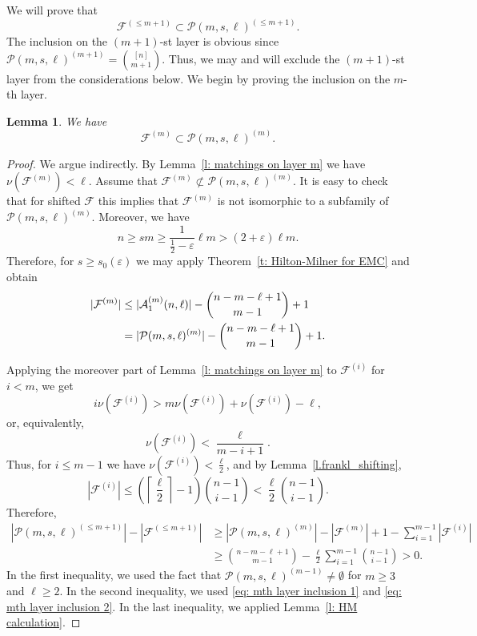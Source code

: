 \documentclass{article}
\newtheorem{lemma}[theorem]{Lemma}
\begin{document}
We will prove that
\[
\mathcal{F}^{(\leq m + 1)} \subset \mathcal{P}(m, s, \ell)^{(\leq m+1)}.
\]
The inclusion on the $(m+1)$-st layer is obvious since
$
\mathcal{P}(m, s, \ell)^{(m+1)} = {[n] \choose m + 1}.
$
Thus, we may and will exclude the $(m+1)$-st layer from the considerations below.
We begin by proving the inclusion on the $m$-th layer.

\begin{lemma} \label{l: mth layer inclusion} We have
    \[
    \mathcal{F}^{(m)} \subset \mathcal{P}(m, s, \ell)^{(m)}.
    \]
\end{lemma}

\begin{proof}
    We argue indirectly. By Lemma~\ref{l: matchings on layer m} we have $\nu(\mathcal{F}^{(m)}) < \ell$. Assume that
    $\mathcal{F}^{(m)} \not\subset \mathcal{P}(m, s, \ell)^{(m)}.$
    It is easy to check that for shifted $\mathcal{F}$ this implies that $\mathcal{F}^{(m)}$ is not isomorphic to a subfamily of $\mathcal{P}(m, s, \ell)^{(m)}$. Moreover, we have
    \[
    n \geq sm \geq \frac{1}{\frac{1}{2}-\varepsilon}\ell m > (2+\varepsilon)\ell m.
    \]
    Therefore, for $s \geq s_0(\varepsilon)$ we may apply Theorem~\ref{t: Hilton-Milner for EMC} and obtain
    \begin{align}
        |\mathcal{F}^{(m)}| \notag
        &\leq |\mathcal{A}_1^{(m)}(n,\ell)| - {n - m - \ell + 1 \choose m - 1} + 1 \\
        \label{eq: mth layer inclusion 1}
        &= |\mathcal{P}(m, s, \ell)^{(m)}| - {n - m - \ell + 1 \choose m - 1} + 1.
    \end{align}

    Applying the moreover part of Lemma~\ref{l: matchings on layer m} to $\mathcal{F}^{(i)}$ for $i < m$, we get
    \[
    i\nu(\mathcal{F}^{(i)}) > m\nu(\mathcal{F}^{(i)}) + \nu(\mathcal{F}^{(i)}) - \ell,
    \]
    or, equivalently,
    \[
    \nu(\mathcal{F}^{(i)}) < \frac{\ell}{m-i+1}.
    \]
    Thus, for $i \leq m-1$ we have $\nu(\mathcal{F}^{(i)}) < \frac{\ell}{2}$, and by Lemma~\ref{l.frankl_shifting},
    \begin{equation} \label{eq: mth layer inclusion 2}
        |\mathcal{F}^{(i)}| \leq \left(\left\lceil \frac{\ell}{2}\right\rceil - 1\right){n - 1 \choose i - 1} < \frac{\ell}{2}{n - 1 \choose i - 1}.
    \end{equation}
    Therefore,
    \begin{align*}
        |\mathcal{P}(m, s, \ell)^{(\leq m+1)}| - |\mathcal{F}^{(\leq m+1)}|
        &\ge |\mathcal{P}(m, s, \ell)^{(m)}| - |\mathcal{F}^{(m)}| +1 - \sum_{i=1}^{m-1}|\mathcal{F}^{(i)}| \\
        &\geq {n - m - \ell + 1 \choose m - 1}  - \frac{\ell}{2}\sum_{i=1}^{m-1} {n - 1 \choose i - 1} > 0.
    \end{align*}
    In the first inequality, we used the fact that $\mathcal{P}(m, s, \ell)^{(m-1)}\neq\emptyset$ for $m \geq 3$ and $\ell \geq 2$. In the second inequality, we used \eqref{eq: mth layer inclusion 1} and \eqref{eq: mth layer inclusion 2}. In the last inequality, we applied Lemma~\ref{l: HM calculation}.
\end{proof}
\end{document}
